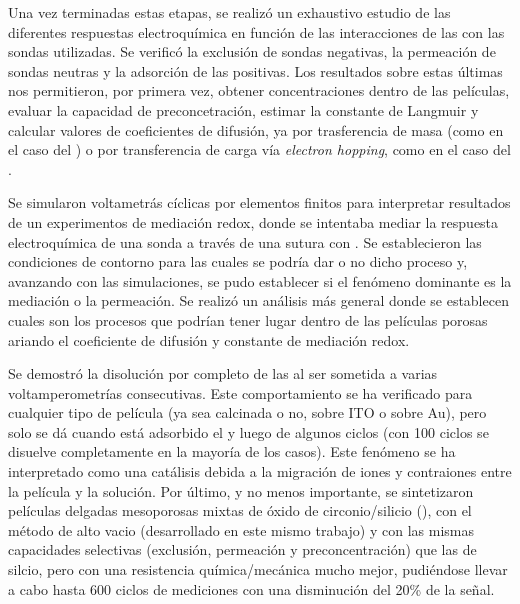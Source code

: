 	Una vez terminadas estas etapas, se realizó un exhaustivo estudio de las diferentes respuestas electroquímica en función de las interacciones de las \pdm\space con las sondas utilizadas. Se verificó la exclusión de sondas negativas, la permeación de sondas neutras y la adsorción de las positivas. Los resultados sobre estas últimas nos permitieron, por primera vez, obtener concentraciones dentro de las películas, evaluar la capacidad de preconcetración, estimar la constante de Langmuir y calcular valores de coeficientes de difusión, ya por trasferencia de masa (como en el caso del \fc) o por transferencia de carga vía \textit{electron hopping}, como en el caso del \ru.

	Se simularon voltametrás cíclicas por elementos finitos para interpretar resultados de un experimentos de mediación redox, donde se intentaba mediar la respuesta electroquímica de una sonda a través de una \pdm\space sutura con \ru. Se establecieron las condiciones de contorno para las cuales se podría dar o no dicho proceso y, avanzando con las simulaciones, se pudo establecer si el fenómeno dominante es la mediación o la permeación. Se realizó un análisis más general donde se establecen cuales son los procesos que podrían tener lugar dentro de las películas porosas ariando el coeficiente de difusión y constante de mediación redox.

	Se demostró la disolución por completo de las \pdmF\space al ser sometida a varias voltamperometrías consecutivas. Este comportamiento se ha verificado para cualquier tipo de película (ya sea calcinada o no, sobre ITO o sobre Au), pero solo se dá cuando está adsorbido el \aminorutenio y luego de algunos ciclos (con 100 ciclos se disuelve completamente en la mayoría de los casos). Este fenómeno se ha interpretado como una catálisis debida a la migración de iones y contraiones entre la película y la solución. Por último, y no menos importante, se sintetizaron películas delgadas mesoporosas mixtas de óxido de circonio/silicio (\pdmZ), con el método de alto vacio (desarrollado en este mismo trabajo) y con las mismas capacidades selectivas (exclusión, permeación y preconcentración) que las de silcio, pero con una resistencia química/mecánica mucho mejor, pudiéndose llevar a cabo hasta 600 ciclos de mediciones con una disminución del 20\% de la señal.


